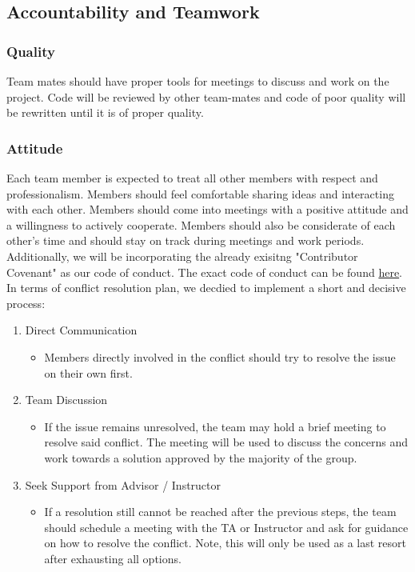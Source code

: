 \documentclass{article}
\begin{document}
\subsection*{Accountability and Teamwork}

\subsubsection*{Quality} 

Team mates should have proper tools for meetings to discuss and work 
on the project.
Code will be reviewed by other team-mates and code of poor quality 
will be rewritten  until it is of proper quality.

\subsubsection*{Attitude}

Each team member is expected to treat all other members with respect and 
professionalism. Members should feel comfortable sharing ideas and 
interacting with each other. Members should come into meetings with a
 positive attitude and a willingness to actively cooperate. 
 Members should also be considerate of each other’s time and 
 should stay on track during meetings and work periods.\\

Additionally, we will be incorporating the already exisitng 
"Contributor Covenant" as our code of conduct. 
The exact code of conduct can be found 
\href{https://www.contributor-covenant.org/version/2/1/code_of_conduct/}
{here}. \\

In terms of conflict resolution plan, we decdied to implement a short and decisive process: \\
\begin{enumerate}
  \item Direct Communication
  \begin{itemize}
    \item Members directly involved in the conflict should 
    try to resolve the issue on their own first. 
  \end{itemize}
  \item Team Discussion
  \begin{itemize}
    \item If the issue remains unresolved, the team may hold a brief
    meeting to resolve said conflict. The meeting will be used to discuss
    the concerns and work towards a solution 
    approved by the majority of the group.
  \end{itemize}
  \item Seek Support from Advisor / Instructor
  \begin{itemize}
    \item If a resolution still cannot be reached after the previous steps,
    the team should schedule a meeting with the TA or Instructor and ask for 
    guidance on how to resolve the conflict. Note, this will only be used as
    a last resort after exhausting all options.
  \end{itemize}
\end{enumerate}
\end{document}
